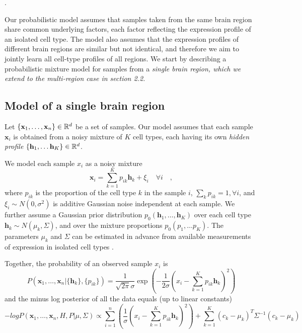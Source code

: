
\newcommand{\x}{\mathbf{x}}
\renewcommand{\c}{\mathbf{h}}
\renewcommand{\H}{{H}}
\newcommand{\Htext}{{C}}
\newcommand{\paren}[1]{\left({#1}\right)}
\newcommand{\brackets}[1]{\left[{#1}\right]}
\newcommand{\norm}[1]{\|{#1}\|}
\newcommand{\argmin}{\operatornamewithlimits{argmin}}.

Our probabilistic model assumes that samples taken from the same brain region share common underlying factors, each factor reflecting the expression profile of an isolated cell type. The model also assumes that the expression profiles of different brain regions are similar but not identical, and therefore we aim to jointly learn all cell-type profiles of all regions. We start by describing a  probabilistic mixture model for samples from a \em{single} brain region, which we extend to the \em{multi-region} case in section 2.2.

\subsection{Model of a single brain region}
Let $\{\x_1, \ldots, \x_n\} \in \reals^d$ be a set of samples. Our model assumes that each sample $\x_i$ is obtained from a noisy mixture of $K$ cell types, each having its own {\em {hidden profile}} $\{\c_1, \ldots \c_K \}\in \reals^d$.

We model each sample $x_i$ as a noisy mixture
\begin{equation*}
 \x_i = \sum_{k=1}^K p_{ik} \c_k + \xi_i \quad\forall i \quad,
\end{equation*}
where $p_{ik}$ is the proportion of the cell type $k$ in the sample $i$, $\sum_k p_{ik} = 1, \forall i$, and $\xi_i \sim N(0,\sigma^2)$ is additive Gaussian noise independent at each sample. We further assume a Gaussian prior distribution $p_0( \c_1, \ldots, \c_K)$ over each cell type $ \c_k  \sim N(\mu_k, \Sigma) $, and over the mixture proportions $p_0(p_1, \ldots p_K)$. The parameters $\mu_k$ and $\Sigma$ can be estimated in advance from available measurements of expression in isolated cell types \cite{okaty2011cell,darmanis2015survey}.

Together, the probability of an observed sample $x_i$ is
\begin{equation*}
    P(\x_1,\ldots,\x_n | \{\c_k\}, \{p_{ik}\}) =  \frac{1}{\sqrt{2\pi}\sigma} \exp\left(-\frac{1}{2\sigma} (x_i - \sum_{k=1}^K p_{ik} \c_k)^2 \right)
\end{equation*}
and the minus log posterior of all the data equals (up to linear constants)
\begin{equation*}
    - log P(\x_1,\ldots,\x_n, \H, P| \mu, \Sigma) \propto
    \sum_{i=1}^n \paren{ \frac{1}{\sigma} (x_i - \sum_{k=1}^K p_{ik} \c_k)^2 }
     + \sum_{k=1}^K (c_k-\mu_k)^T\Sigma^{-1}(c_k-\mu_k)
\end{equation*}

